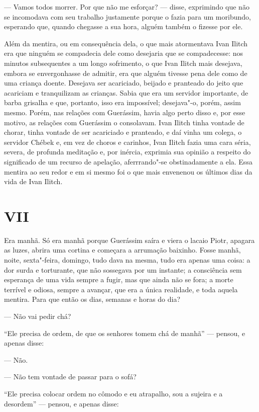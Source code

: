 --- Vamos todos morrer. Por que não me esforçar? --- disse, exprimindo que
não se incomodava com seu trabalho justamente porque o fazia para um
moribundo, esperando que, quando chegasse a sua hora, alguém também o
fizesse por ele.

Além da mentira, ou em consequência dela, o que mais atormentava Ivan
Ilitch era que ninguém se compadecia dele como desejaria que se
compadecesse: nos minutos subsequentes a um longo sofrimento, o que Ivan
Ilitch mais desejava, embora se envergonhasse de admitir, era que alguém
tivesse pena dele como de uma criança doente. Desejava ser acariciado,
beijado e pranteado do jeito que acariciam e tranquilizam as crianças.
Sabia que era um servidor importante, de barba grisalha e que, portanto,
isso era impossível; desejava"-o, porém, assim mesmo. Porém, nas relações
com Guerássim, havia algo perto disso e, por esse motivo, as relações
com Guerássim o consolavam. Ivan Ilitch tinha vontade de chorar, tinha
vontade de ser acariciado e pranteado, e daí vinha um colega, o servidor
Chébek e, em vez de choros e carinhos, Ivan Ilitch fazia uma cara séria,
severa, de profunda meditação e, por inércia, exprimia sua opinião a
respeito do significado de um recurso de apelação, aferrrando"-se
obstinadamente a ela. Essa mentira ao seu redor e em si mesmo foi o que
mais envenenou os últimos dias da vida de Ivan Ilitch.

\section{VII}

Era manhã. Só era manhã porque Guerássim saíra e viera o lacaio Piotr,
apagara as luzes, abrira uma cortina e começara a arrumação baixinho.
Fosse manhã, noite, sexta"-feira, domingo, tudo dava na mesma, tudo era
apenas uma coisa: a dor surda e torturante, que não sossegava por um
instante; a consciência sem esperança de uma vida sempre a fugir, mas
que ainda não se fora; a morte terrível e odiosa, sempre a avançar, que
era a única realidade, e toda aquela mentira. Para que então os dias,
semanas e horas do dia?

--- Não vai pedir chá?

``Ele precisa de ordem, de que os senhores tomem chá de manhã'' ---
pensou, e apenas disse:

--- Não.

--- Não tem vontade de passar para o sofá?

``Ele precisa colocar ordem no cômodo e eu atrapalho, sou a sujeira e a
desordem'' --- pensou, e apenas disse:

